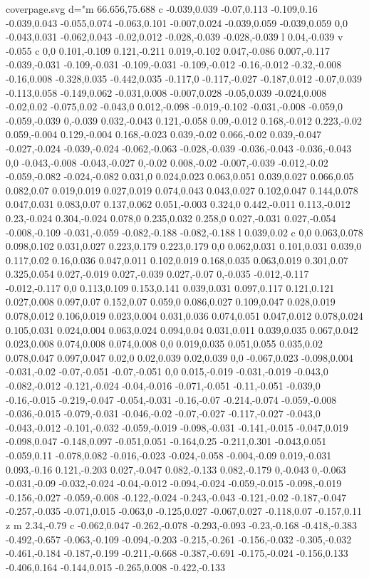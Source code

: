 \begin{filecontents}[noheader]{coverpage.svg}
					 d="m 66.656,75.688 c -0.039,0.039 -0.07,0.113 -0.109,0.16 -0.039,0.043 -0.055,0.074 -0.063,0.101 -0.007,0.024 -0.039,0.059 -0.039,0.059 0,0 -0.043,0.031 -0.062,0.043 -0.02,0.012 -0.028,-0.039 -0.028,-0.039 l 0.04,-0.039 v -0.055 c 0,0 0.101,-0.109 0.121,-0.211 0.019,-0.102 0.047,-0.086 0.007,-0.117 -0.039,-0.031 -0.109,-0.031 -0.109,-0.031 -0.109,-0.012 -0.16,-0.012 -0.32,-0.008 -0.16,0.008 -0.328,0.035 -0.442,0.035 -0.117,0 -0.117,-0.027 -0.187,0.012 -0.07,0.039 -0.113,0.058 -0.149,0.062 -0.031,0.008 -0.007,0.028 -0.05,0.039 -0.024,0.008 -0.02,0.02 -0.075,0.02 -0.043,0 0.012,-0.098 -0.019,-0.102 -0.031,-0.008 -0.059,0 -0.059,-0.039 0,-0.039 0.032,-0.043 0.121,-0.058 0.09,-0.012 0.168,-0.012 0.223,-0.02 0.059,-0.004 0.129,-0.004 0.168,-0.023 0.039,-0.02 0.066,-0.02 0.039,-0.047 -0.027,-0.024 -0.039,-0.024 -0.062,-0.063 -0.028,-0.039 -0.036,-0.043 -0.036,-0.043 0,0 -0.043,-0.008 -0.043,-0.027 0,-0.02 0.008,-0.02 -0.007,-0.039 -0.012,-0.02 -0.059,-0.082 -0.024,-0.082 0.031,0 0.024,0.023 0.063,0.051 0.039,0.027 0.066,0.05 0.082,0.07 0.019,0.019 0.027,0.019 0.074,0.043 0.043,0.027 0.102,0.047 0.144,0.078 0.047,0.031 0.083,0.07 0.137,0.062 0.051,-0.003 0.324,0 0.442,-0.011 0.113,-0.012 0.23,-0.024 0.304,-0.024 0.078,0 0.235,0.032 0.258,0 0.027,-0.031 0.027,-0.054 -0.008,-0.109 -0.031,-0.059 -0.082,-0.188 -0.082,-0.188 l 0.039,0.02 c 0,0 0.063,0.078 0.098,0.102 0.031,0.027 0.223,0.179 0.223,0.179 0,0 0.062,0.031 0.101,0.031 0.039,0 0.117,0.02 0.16,0.036 0.047,0.011 0.102,0.019 0.168,0.035 0.063,0.019 0.301,0.07 0.325,0.054 0.027,-0.019 0.027,-0.039 0.027,-0.07 0,-0.035 -0.012,-0.117 -0.012,-0.117 0,0 0.113,0.109 0.153,0.141 0.039,0.031 0.097,0.117 0.121,0.121 0.027,0.008 0.097,0.07 0.152,0.07 0.059,0 0.086,0.027 0.109,0.047 0.028,0.019 0.078,0.012 0.106,0.019 0.023,0.004 0.031,0.036 0.074,0.051 0.047,0.012 0.078,0.024 0.105,0.031 0.024,0.004 0.063,0.024 0.094,0.04 0.031,0.011 0.039,0.035 0.067,0.042 0.023,0.008 0.074,0.008 0.074,0.008 0,0 0.019,0.035 0.051,0.055 0.035,0.02 0.078,0.047 0.097,0.047 0.02,0 0.02,0.039 0.02,0.039 0,0 -0.067,0.023 -0.098,0.004 -0.031,-0.02 -0.07,-0.051 -0.07,-0.051 0,0 0.015,-0.019 -0.031,-0.019 -0.043,0 -0.082,-0.012 -0.121,-0.024 -0.04,-0.016 -0.071,-0.051 -0.11,-0.051 -0.039,0 -0.16,-0.015 -0.219,-0.047 -0.054,-0.031 -0.16,-0.07 -0.214,-0.074 -0.059,-0.008 -0.036,-0.015 -0.079,-0.031 -0.046,-0.02 -0.07,-0.027 -0.117,-0.027 -0.043,0 -0.043,-0.012 -0.101,-0.032 -0.059,-0.019 -0.098,-0.031 -0.141,-0.015 -0.047,0.019 -0.098,0.047 -0.148,0.097 -0.051,0.051 -0.164,0.25 -0.211,0.301 -0.043,0.051 -0.059,0.11 -0.078,0.082 -0.016,-0.023 -0.024,-0.058 -0.004,-0.09 0.019,-0.031 0.093,-0.16 0.121,-0.203 0.027,-0.047 0.082,-0.133 0.082,-0.179 0,-0.043 0,-0.063 -0.031,-0.09 -0.032,-0.024 -0.04,-0.012 -0.094,-0.024 -0.059,-0.015 -0.098,-0.019 -0.156,-0.027 -0.059,-0.008 -0.122,-0.024 -0.243,-0.043 -0.121,-0.02 -0.187,-0.047 -0.257,-0.035 -0.071,0.015 -0.063,0 -0.125,0.027 -0.067,0.027 -0.118,0.07 -0.157,0.11 z m 2.34,-0.79 c -0.062,0.047 -0.262,-0.078 -0.293,-0.093 -0.23,-0.168 -0.418,-0.383 -0.492,-0.657 -0.063,-0.109 -0.094,-0.203 -0.215,-0.261 -0.156,-0.032 -0.305,-0.032 -0.461,-0.184 -0.187,-0.199 -0.211,-0.668 -0.387,-0.691 -0.175,-0.024 -0.156,0.133 -0.406,0.164 -0.144,0.015 -0.265,0.008 -0.422,-0.133 
\end{filecontents}
